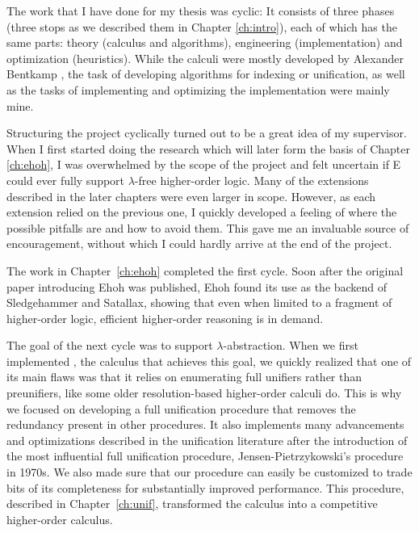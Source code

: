 The work that I have done for my thesis
was cyclic: It consists of three phases (three stops as we described them in
Chapter \ref{ch:intro}), each of which has the same parts: theory (calculus and
algorithms), engineering (implementation) and optimization (heuristics). While
the calculi were mostly developed by Alexander Bentkamp
\cite{bbcw-21-lfho,bbtvw-21-sup-lam,bbtv-21-full-ho-sup}, the task of developing
algorithms for indexing or unification, as well as the tasks of implementing and
optimizing the implementation were mainly mine.

Structuring the project cyclically turned out to be a great idea of my
supervisor. When I first started doing the research which will later form the
basis of Chapter \ref{ch:ehoh}, I was overwhelmed by the scope of the project
and felt uncertain if E could ever fully support $\lambda$-free higher-order
logic. Many of the extensions described in the  later chapters were even larger
in scope. However, as each extension relied on the previous one, I quickly
developed a feeling of where the possible pitfalls are and how to avoid them.
This gave me an invaluable source of encouragement, without which I could hardly
arrive at the end of the project.

The work in Chapter~\ref{ch:ehoh} completed the first cycle. Soon after the
original paper introducing Ehoh \cite{vbss-19-ehoh1} was published, Ehoh found
its use as the backend of Sledgehammer and Satallax, showing that even when
limited to a fragment of higher-order logic, efficient higher-order reasoning is
in demand.

The goal of the next cycle was to support $\lambda$-abstraction. When we first
implemented \lsup{}, the calculus that achieves this goal, we quickly realized that
one of its main flaws was that it relies on enumerating full unifiers rather
than preunifiers, like some older resolution-based higher-order calculi do. This
is why we focused on developing a full unification procedure that removes the
redundancy present in other procedures. It also implements many advancements
and optimizations described in the unification literature after the introduction
of the most influential full unification procedure, Jensen-Pietrzykowski's
procedure in 1970s. We also made sure that our procedure can easily be customized to
trade bits of its completeness for substantially improved performance. This
procedure, described in Chapter~\ref{ch:unif}, transformed the \lsup{} calculus
into a competitive higher-order calculus.

